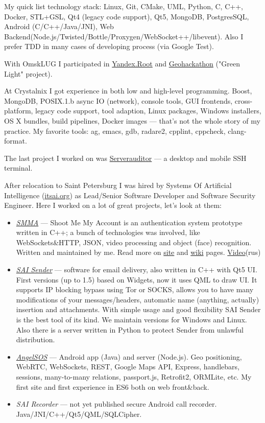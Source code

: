 \documentclass[letterpaper,11pt]{article}
\begin{document}
	My quick list technology stack: Linux, Git, CMake, UML, Python, C, C++, Docker, STL+GSL, Qt4 (legacy code support), Qt5, MongoDB, PostgresSQL, Android (C/C++/Java/JNI), Web Backend(Node.js/Twisted/Bottle/Proxygen/WebSocket++/libevent). Also I prefer TDD in many cases of developing process (via Google Test).
	
	With OmskLUG I participated in \href{http://omsklug.com/members/chemtech/activity/759}{Yandex.Root} and \href{https://vk.com/geohackathon}{Geohackathon} ("Green Light" project).
	
	At Crystalnix I got experience in both low and high-level programming. Boost, MongoDB, POSIX.1.b async IO (network), console tools, GUI frontends, cross-platform, legacy code support, tool adaption, Linux packages, Windows installers, OS X bundles, build pipelines, Docker images --- that's not the whole story of my practice. My favorite tools: ag, emacs, gdb, radare2, cpplint, cppcheck, clang-format.
	
	The last project I worked on was \href{http://serverauditor.com/}{Serverauditor} --- a desktop and mobile SSH terminal.
	
	After relocation to Saint Petersburg I was hired by Systems Of Artificial Intelligence (\href{https://itsai.org}{itsai.org}) as Lead/Senior Software Developer and Software Security Engineer.
	Here I worked on a lot of great projects, let's look at them:
	\begin{itemize}
		\item \href{https://smma.pro/}{\emph{SMMA}} --- Shoot Me My Account is an authentication system prototype written in C++; a bunch of technologies was involved, like WebSockets\&HTTP, JSON, video processing and object (face) recognition. Written and maintained by me. Read more on \href{https://smma.pro/}{site} and \href{https://github.com/saicorp/SMMA/wiki}{wiki} pages. \href{https://youtu.be/X2SRc-d5yBA}{Video}(rus)
		\item \href{https://itsai.org/products/view/sai-sender}{\emph{SAI Sender}} --- software for email delivery, also written in C++ with Qt5 UI. First versions (up to 1.5) based on Widgets, now it uses QML to draw UI. It supports IP blocking bypass using Tor or SOCKS, allows you to have many modifications of your messages/headers, automatic name (anything, actually) insertion and attachments. With simple usage and good flexibility SAI Sender is the best tool of its kind. We maintain versions for Windows and Linux. Also there is a server written in Python to protect Sender from unlawful distribution.
		\item \href{https://angelsos.ru/}{\emph{AngelSOS}} --- Android app (Java) and server (Node.js). Geo positioning, WebRTC, WebSockets, REST, Google Maps API, Express, handlebars, sessions, many-to-many relations, passport.js, Retrofit2, ORMLite, etc. My first site and first experience in ES6 both on web front\&back.
		\item \emph{SAI Recorder} --- not yet published secure Android call recorder. Java/JNI/C++/Qt5/QML/SQLCipher.
	\end{itemize}
	
\end{document}
